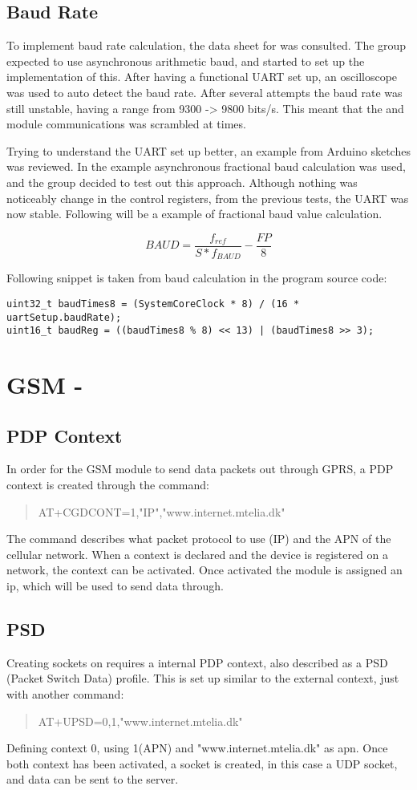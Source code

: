 \subsection{Baud Rate}
To implement baud rate calculation, the data sheet for \SAMD was consulted. The group expected to use asynchronous arithmetic baud, and started to set up the implementation of this. After having a functional UART set up, an oscilloscope was used to auto detect the baud rate. After several attempts the baud rate was still unstable, having a range from 9300 -> 9800 bits/s. This meant that the \GPS and \SARA module communications was scrambled at times.
 
Trying to understand the UART set up better, an example from Arduino sketches was reviewed. In the example asynchronous fractional baud calculation was used, and the group decided to test out this approach. Although nothing was noticeably change in the control registers, from the previous tests, the UART was now stable.
Following will be a example of fractional baud value calculation.

\[BAUD = \frac{f_{ref}}{S*f_{BAUD}} - \frac{FP}{8}\]

Following snippet is taken from baud calculation in the program source code:
\begin{verbatim}
uint32_t baudTimes8 = (SystemCoreClock * 8) / (16 * uartSetup.baudRate);
uint16_t baudReg = ((baudTimes8 % 8) << 13) | (baudTimes8 >> 3);	
\end{verbatim}

\section{GSM - \SARA}
\subsection{PDP Context}
In order for the GSM module to send data packets out through GPRS, a PDP context is created through the command:
\begin{quote}
	AT+CGDCONT=1,"IP","www.internet.mtelia.dk"
\end{quote}

The command describes what packet protocol to use (IP) and the APN of the cellular network. When a context is declared and the device is registered on a network, the context can be activated. Once activated the module is assigned an ip, which will be used to send data through.

\subsection{PSD}
Creating sockets on \SARA requires a internal PDP context, also described as a PSD (Packet Switch Data) profile. This is set up similar to the external context, just with another command:
\begin{quote}
	AT+UPSD=0,1,"www.internet.mtelia.dk"
\end{quote}
Defining context 0, using 1(APN) and "www.internet.mtelia.dk" as apn. Once both context has been activated, a socket is created, in this case a UDP socket, and data can be sent to the server.
